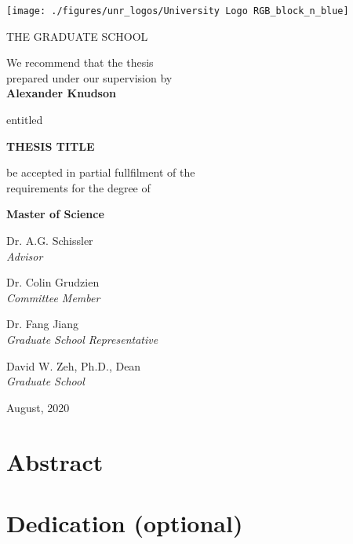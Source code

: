 \documentclass[11pt, oneside, openany]{scrbook}
\begin{document}
\newpage
\thispagestyle{empty}
\begin{center}

\texttt{[image: ./figures/unr\_logos/University Logo RGB\_block\_n\_blue]}

THE GRADUATE SCHOOL

\vspace{1em}
We recommend that the thesis \\
prepared under our supervision by\\

\vspace{1em}
\textbf{Alexander Knudson}

\vspace{1em}
entitled

\textbf{THESIS TITLE}

\vspace{2em}
be accepted in partial fullfilment of the \\
requirements for the degree of

\vspace{1em}
\textbf{Master of Science}

\vspace{1em}
Dr. A.G. Schissler \\
\textit{Advisor}

\vspace{1em}
Dr. Colin Grudzien\\
\textit{Committee Member}

\vspace{1em}
Dr. Fang Jiang \\
\textit{Graduate School Representative}

\vspace{1em}
David W. Zeh, Ph.D., Dean \\
\textit{Graduate School}

\vspace{1em}
August, 2020
\end{center}


\newpage
\setcounter{page}{1} %
\section*{Abstract}
\lipsum[1]


\newpage
\section*{Dedication (optional)}
\lipsum[2-3]
\end{document}
